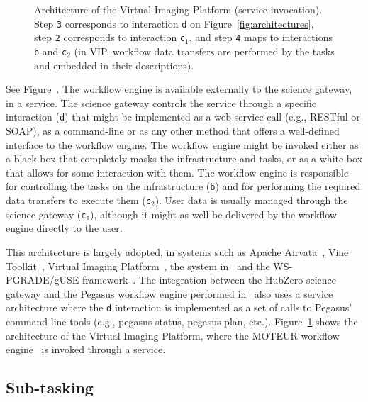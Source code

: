 \documentclass[preprint,3p,twocolumn]{elsarticle}
\begin{document}
\begin{figure}
\centering
\def\svgwidth{1.5\columnwidth}

\caption{Architecture of the Virtual Imaging Platform (service
  invocation).  Step \texttt{3} corresponds to interaction \texttt{d}
  on Figure~\ref{fig:architectures}, step \texttt{2} corresponds to
  interaction \texttt{c$_1$}, and step \texttt{4} maps to interactions
  \texttt{b} and \texttt{c$_2$} (in VIP, workflow data transfers are
  performed by the tasks and embedded in their descriptions).}
\label{fig:vip-architecture}
\end{figure}

See Figure~. The workflow engine is available
externally to the science gateway, in a service. The science gateway
controls the service through a specific interaction (\texttt{d}) that
might be implemented as a web-service call (e.g., RESTful or SOAP), as
a command-line or as any other method that offers a well-defined
interface to the workflow engine. The workflow engine might be invoked
either as a black box that completely masks the infrastructure and
tasks, or as a white box that allows for some interaction with
them. The workflow engine is responsible for controlling the tasks on
the infrastructure (\texttt{b}) and for performing the required data
transfers to execute them (\texttt{c$_2$}). User data is usually
managed through the science gateway (\texttt{c$_1$}), although it
might as well be delivered by the workflow engine directly to the
user.

This architecture is largely adopted, in systems such as Apache
Airvata~\cite{marru2011apache}, Vine
Toolkit~\cite{DBLP:journals/scpe/SzejnfeldDKKKKLPTWDNW10}, Virtual
Imaging Platform~\cite{GLAT-13}, the system
in~\cite{wu2010accelerating} and the WS-PGRADE/gUSE
framework~\cite{Kacsuk2012}. The integration between the
HubZero science gateway and the Pegasus workflow engine performed
in~\cite{CPE:CPE3257} also uses a service architecture where the
\texttt{d} interaction is implemented as a set of calls to Pegasus'
command-line tools (e.g., pegasus-status, pegasus-plan,
etc.). Figure~\ref{fig:vip-architecture} shows the architecture of the
Virtual Imaging Platform, where the MOTEUR workflow
engine~\cite{GLAT-08i} is invoked through a service.

\subsection{Sub-tasking}
\end{document}
